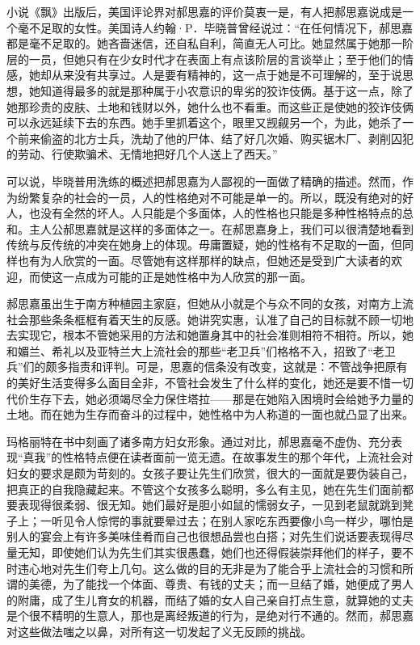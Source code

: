 \par 小说《飘》出版后，美国评论界对郝思嘉的评价莫衷一是，有人把郝思嘉说成是一个毫不足取的女性。美国诗人约翰·P．毕晓普曾经说过：“在任何情况下，郝思嘉都是毫不足取的。她吝啬迷信，还自私自利，简直无人可比。她显然属于她那一阶层的一员，但她只有在少女时代才在表面上有点该阶层的言谈举止；至于他们的情感，她却从来没有共享过。人是要有精神的，这一点于她是不可理解的，至于说思想，她知道得最多的就是那种属于小农意识的卑劣的狡诈伎俩。基于这一点，除了她那珍贵的皮肤、土地和钱财以外，她什么也不看重。而这些正是使她的狡诈伎俩可以永远延续下去的东西。她手里抓着这个，眼里又觊觎另一个，为此，她杀了一个前来偷盗的北方士兵，洗劫了他的尸体、结了好几次婚、购买锯木厂、剥削囚犯的劳动、行使欺骗术、无情地把好几个人送上了西天。”
\par 可以说，毕晓普用洗练的概述把郝思嘉为人鄙视的一面做了精确的描述。然而，作为纷繁复杂的社会的一员，人的性格绝对不可能是单一的。所以，既没有绝对的好人，也没有全然的坏人。人只能是个多面体，人的性格也只能是多种性格特点的总和。主人公郝思嘉就是这样的多面体之一。在郝思嘉身上，我们可以很清楚地看到传统与反传统的冲突在她身上的体现。毋庸置疑，她的性格有不足取的一面，但同样也有为人欣赏的一面。尽管她有这样那样的缺点，但她还是受到广大读者的欢迎，而使这一点成为可能的正是她性格中为人欣赏的那一面。
\par 郝思嘉虽出生于南方种植园主家庭，但她从小就是个与众不同的女孩，对南方上流社会那些条条框框有着天生的反感。她讲究实惠，认准了自己的目标就不顾一切地去实现它，根本不管她采用的方法和她置身其中的社会准则相符不相符。所以，她和媚兰、希礼以及亚特兰大上流社会的那些“老卫兵”们格格不入，招致了“老卫兵”们的颇多指责和评判。可是，思嘉的信条没有改变，这就是：不管战争把原有的美好生活变得多么面目全非，不管社会发生了什么样的变化，她还是要不惜一切代价生存下去，她必须竭尽全力保住塔拉——那是在她陷入困境时会给她予力量的土地。而在她为生存而奋斗的过程中，她性格中为人称道的一面也就凸显了出来。
\par 玛格丽特在书中刻画了诸多南方妇女形象。通过对比，郝思嘉毫不虚伪、充分表现“真我”的性格特点便在读者面前一览无遗。在故事发生的那个年代，上流社会对妇女的要求是颇为苛刻的。女孩子要让先生们欣赏，很大的一面就是要伪装自己，把真正的自我隐藏起来。不管这个女孩多么聪明，多么有主见，她在先生们面前都要表现得很柔弱、很无知。她们最好是胆小如鼠的懦弱女子，一见到老鼠就跳到凳子上；一听见令人惊愕的事就要晕过去；在别人家吃东西要像小鸟一样少，哪怕是别人的宴会上有许多美味佳肴而自己也很想品尝也白搭；对先生们说话要表现得尽量无知，即使她们认为先生们其实很愚蠢，她们也还得假装崇拜他们的样子，要不时违心地对先生们夸上几句。这么做的目的无非是为了能合乎上流社会的习惯和所谓的美德，为了能找一个体面、尊贵、有钱的丈夫；而一旦结了婚，她便成了男人的附庸，成了生儿育女的机器，而结了婚的女人自己亲自打点生意，就算她的丈夫是个很不精明的生意人，那也是离经叛道的行为，是绝对行不通的。然而，郝思嘉对这些做法嗤之以鼻，对所有这一切发起了义无反顾的挑战。
